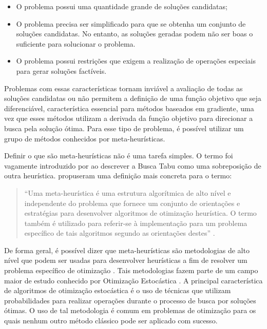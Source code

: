 \begin{itemize}
\item O problema possui uma quantidade grande de soluções candidatas;
\item O problema precisa ser simplificado para que se obtenha um conjunto de soluções candidatas. No entanto, as soluções geradas podem não ser boas o suficiente para solucionar o problema.
\item O problema possui restrições que exigem a realização de operações especiais para gerar soluções factíveis.
\end{itemize}

Problemas com essas características tornam inviável a avaliação de todas as soluções candidatas ou não permitem a definição de uma função objetivo que seja diferenciável, característica essencial para métodos baseados em gradiente, uma vez que esses métodos utilizam a derivada da função objetivo para direcionar a busca pela solução ótima. Para esse tipo de problema, é possível utilizar um grupo de métodos conhecidos por meta-heurísticas. 

Definir o que são meta-heurísticas não é uma tarefa simples. O termo foi vagamente introduzido por  ao descrever a Busca Tabu como uma sobreposição de outra heurística.  propuseram uma definição mais concreta para o termo:

\begin{quote}
“Uma meta-heurística é uma estrutura algorítmica de alto nível e independente do problema que fornece um conjunto de orientações e estratégias para desenvolver algoritmos de otimização heurística. O termo também é utilizado para referir-se à implementação para um problema específico de tais algoritmos segundo as orientações destes” \cite{sorensen2013metaheuristics}.
\end{quote}
De forma geral, é possível dizer que meta-heurísticas são metodologias de alto nível que podem ser usadas para desenvolver heurísticas a fim de resolver um problema específico de otimização \cite{Talbi2009}. Tais metodologias fazem parte de um campo maior de estudo conhecido por Otimização Estocástica \cite{Luke2013Metaheuristics}. A principal característica de algoritmos de otimização estocástica é o uso de técnicas que utilizam probabilidades para realizar operações durante o processo de busca por soluções ótimas. O uso de tal metodologia é comum em problemas de otimização para os quais nenhum outro método clássico pode ser aplicado com sucesso.

